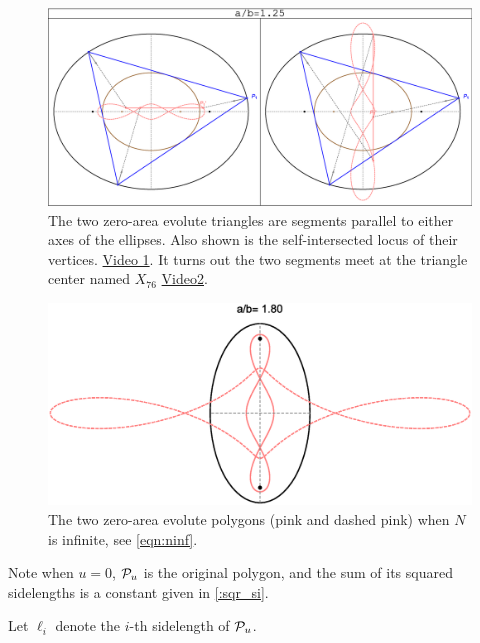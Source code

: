 \begin{figure}
    \centering
    \includegraphics[width=\textwidth]{pics/0090_zero_area_n3_both.eps}
    \caption{The two zero-area evolute triangles are segments parallel to either axes of the ellipses.
             Also shown is the self-intersected locus of their vertices. \href{https://youtu.be/f80QaYs5_J4}{Video 1}.
             It turns out the two segments meet at the triangle center named $X_{76}$ \cite{etc} \href{https://youtu.be/OFA_j25R8ks}{Video2}.}
    \label{fig:zero-n3}
\end{figure}

\begin{figure}
    \centering
    \includegraphics[width=.7\textwidth]{pics/0100_zero_area_ninf_both.eps}
    \caption{The two zero-area evolute polygons (pink and dashed pink) when $N$ is infinite, see \cref{eqn:ninf}.}
    \label{fig:zero-area-inf}
\end{figure}

Note when $u=0$, $\mathcal{P}_u$ is the original polygon, and the sum of its squared sidelengths is a constant given in \cref{:sqr_si}.

Let $\ell_i$ denote the $i$-th sidelength of $\mathcal{P}_u$.

